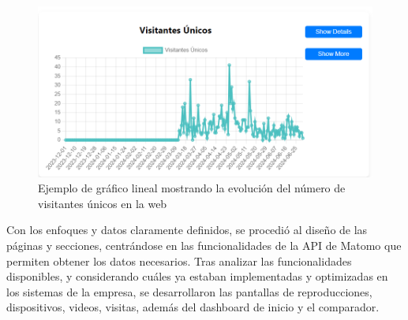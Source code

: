 \begin{figure}[ht]
\begin{minipage}[b]{0.45\textwidth}
    \end{minipage}
    \hfill
    \begin{minipage}[b]{0.45\textwidth}
        \includegraphics[width=\textwidth]{imaxes/lineGraph.png}
        \caption{Ejemplo de gráfico lineal mostrando la evolución del número de visitantes únicos en la web}
        \label{fig:imagen2}
    \end{minipage}
\end{figure}

Con los enfoques y datos claramente definidos, se procedió al diseño de las páginas y secciones, centrándose en las funcionalidades de la API de 
Matomo que permiten obtener los datos necesarios. Tras analizar las funcionalidades disponibles, y considerando cuáles ya estaban implementadas y 
optimizadas en los sistemas de la empresa, se desarrollaron las pantallas de reproducciones, dispositivos, videos, visitas, además del dashboard 
de inicio y el comparador.

